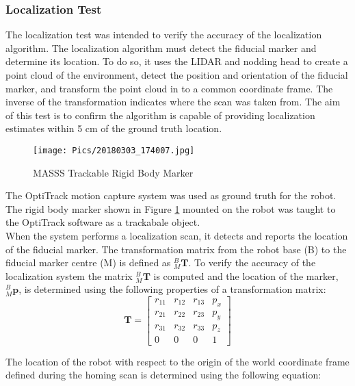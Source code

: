 \subsubsection{Localization Test}

The localization test was intended to verify the accuracy of the localization algorithm. The localization algorithm must detect the fiducial marker and determine its location. To do so, it uses the LIDAR and nodding head to create a point cloud of the environment, detect the position and orientation of the fiducial marker, and transform the point cloud in to a common coordinate frame. The inverse of the transformation indicates where the scan was taken from. The aim of this test is to confirm the algorithm is capable of providing localization estimates within 5 cm of the ground truth location.\\

\begin{figure}
    \centering
    \texttt{[image: Pics/20180303\_174007.jpg]}
    \caption{MASSS Trackable Rigid Body Marker}
    \label{fig:rigidbody}
\end{figure}

The OptiTrack motion capture system was used as ground truth for the robot. The rigid body marker shown in Figure \ref{fig:rigidbody} mounted on the robot was taught to the OptiTrack software as a trackabale object.\\

When the system performs a localization scan, it detects and reports the location of the fiducial marker. The transformation matrix from the robot base (B) to the fiducial marker centre (M) is defined as $^B_M\mathbf{T}$. To verify the accuracy of the localization system the matrix $^B_{M}\mathbf{T}$ is computed and the location of the marker, $^B_{M}\mathbf{p}$, is determined using the following properties of a transformation matrix:\\

\begin{equation*}
\mathbf{T} = \begin{bmatrix}
    r_{11} & r_{12} & r_{13} & p_{x} \\
    r_{21} & r_{22} & r_{23} & p_{y} \\
    r_{31} & r_{32} & r_{33} & p_{z} \\
    0 & 0 & 0 & 1
\end{bmatrix}
\end{equation*}

The location of the robot with respect to the origin of the world coordinate frame defined during the homing scan is determined using the following equation:

